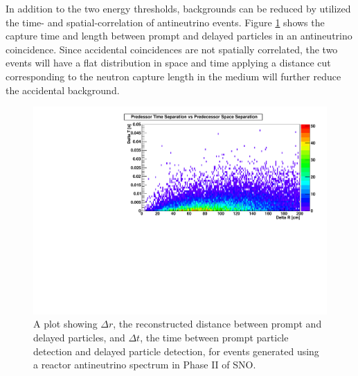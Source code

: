 \documentclass[preprint,12pt]{elsarticle}
\begin{document}
In addition to the two energy thresholds, backgrounds can be reduced by utilized the time- and spatial-correlation of antineutrino events.  Figure \ref{fig:drdt} shows the capture time and length between prompt and delayed particles in an antineutrino coincidence. Since accidental coincidences are not spatially correlated, the two events will have a flat distribution in space and time applying a distance cut corresponding to the neutron capture length in the medium will further reduce the accidental background.  

\begin{figure}[htbp]
   \centering
   \includegraphics[width=14 cm]{drdtSMC.pdf} %
   \caption{A plot showing $\Delta r$, the reconstructed distance between prompt and delayed particles, and $\Delta t$, the time between prompt particle detection and delayed particle detection, for events generated using a reactor antineutrino spectrum in Phase II of SNO.}
   \label{fig:drdt}
\end{figure}
\end{document}
